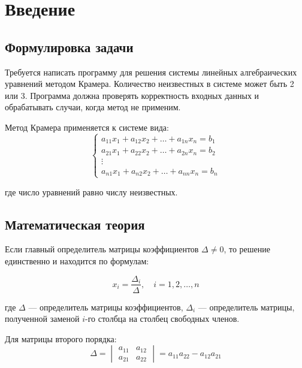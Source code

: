 \documentclass[14pt,a4paper]{scrartcl}
\begin{document}
\thispagestyle{empty}
\setcounter{page}{2}
\tableofcontents
\newpage

\section{Введение}
\label{sec:intro}

\subsection{Формулировка задачи}

Требуется написать программу для решения системы линейных алгебраических уравнений методом Крамера. Количество неизвестных в системе может быть 2 или 3. Программа должна проверять корректность входных данных и обрабатывать случаи, когда метод не применим.

Метод Крамера применяется к системе вида:
\begin{equation}
\begin{cases}
a_{11}x_1 + a_{12}x_2 + \dots + a_{1n}x_n = b_1 \\
a_{21}x_1 + a_{22}x_2 + \dots + a_{2n}x_n = b_2 \\
\vdots \\
a_{n1}x_1 + a_{n2}x_2 + \dots + a_{nn}x_n = b_n
\end{cases}
\end{equation}

где число уравнений равно числу неизвестных.

\subsection{Математическая теория}

Если главный определитель матрицы коэффициентов $\Delta \neq 0$, то решение единственно и находится по формулам:

\begin{equation}
x_i = \frac{\Delta_i}{\Delta}, \quad i = 1, 2, \dots, n
\end{equation}

где $\Delta$ --- определитель матрицы коэффициентов, $\Delta_i$ --- определитель матрицы, полученной заменой $i$-го столбца на столбец свободных членов.

Для матрицы второго порядка:
\begin{equation}
\Delta = \begin{vmatrix} a_{11} & a_{12} \\ a_{21} & a_{22} \end{vmatrix} = a_{11}a_{22} - a_{12}a_{21}
\end{equation}
\end{document}
